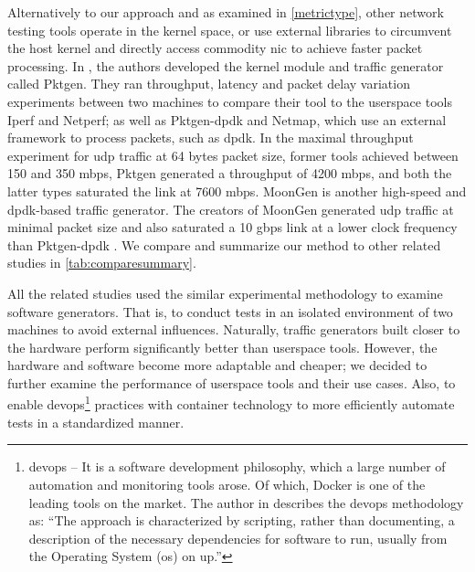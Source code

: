 \skippara Alternatively to our approach and as examined in \cref{metrictype}, other network testing tools operate in the kernel space, or use external libraries to circumvent the host kernel and directly access commodity \acrshort{nic} to achieve faster packet processing.
In \cite{turull2016pktgen}, the authors developed the kernel module and traffic generator called Pktgen.
They ran throughput, latency and packet delay variation experiments between two machines to compare their tool to the userspace tools Iperf and Netperf; as well as Pktgen-\acrshort{dpdk} and Netmap, which use an external framework to process packets, such as \acrshort{dpdk}.
In the maximal throughput experiment for \acrshort{udp} traffic at 64 bytes packet size, former tools achieved between 150 and 350 \acrshort{mbps}, Pktgen generated a throughput of 4200 \acrshort{mbps}, and both the latter types saturated the link at 7600 \acrshort{mbps}.
MoonGen is another high-speed and \acrshort{dpdk}-based traffic generator.
The creators of MoonGen generated \acrshort{udp} traffic at minimal packet size and also saturated a 10 \acrshort{gbps} link at a lower clock frequency than Pktgen-\acrshort{dpdk} \cite{emmerich2015moongen}.
We compare and summarize our method to other related studies in \cref{tab:comparesummary}.


\skippara All the related studies used the similar experimental methodology to examine software generators.
That is, to conduct tests in an isolated environment of two machines to avoid external influences.
Naturally, traffic generators built closer to the hardware perform significantly better than userspace tools.
However, the hardware and software become more adaptable and cheaper; we decided to further examine the performance of userspace tools and their use cases.
Also, to enable \acrshort{devops}\footnote{\gls{devops} -- It is a software development philosophy, which a large number of automation and monitoring tools arose.
Of which, Docker is one of the leading tools on the market.
The author in \cite{boettiger2015introduction} describes the \acrshort{devops} methodology as: ``The approach is characterized by scripting, rather than documenting, a description of
the necessary dependencies for software to run, usually
from the Operating System (\acrshort{os}) on up.''
} practices with container technology to more efficiently automate tests in a standardized manner.

\clearpage


